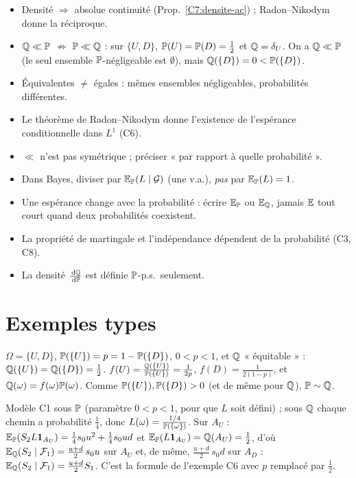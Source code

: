 \documentclass[11pt,a4paper]{article}
\begin{document}
\begin{liens}
\begin{itemize}
  \item Densité $\Rightarrow$ absolue continuité (Prop.~\ref{C7:densite-ac}) ; Radon--Nikodym donne la réciproque.
  \item $\mathbb{Q}\ll\mathbb{P}$ $\not\Rightarrow$ $\mathbb{P}\ll\mathbb{Q}$ : sur $\{U,D\}$, $\mathbb{P}(U)=\mathbb{P}(D)=\frac12$ et $\mathbb{Q}=\delta_U$. On a $\mathbb{Q}\ll\mathbb{P}$
  (le seul ensemble $\mathbb{P}$-négligeable est $\emptyset$), mais $\mathbb{Q}(\{D\})=0<\mathbb{P}(\{D\})$.
  \item Équivalentes $\neq$ égales : mêmes ensembles négligeables, probabilités différentes.
  \item Le théorème de Radon--Nikodym donne l'existence de l'espérance conditionnelle dans $L^1$ (C6).
\end{itemize}
\end{liens}

\begin{piege}
\begin{itemize}
  \item $\ll$ n'est pas symétrique ; préciser « par rapport à quelle probabilité ».
  \item Dans Bayes, diviser par $\mathbb{E}_{\mathbb{P}}(L\mid\mathcal{G})$ (une v.a.), \emph{pas} par $\mathbb{E}_{\mathbb{P}}(L)=1$.
  \item Une espérance change avec la probabilité : écrire $\mathbb{E}_{\mathbb{P}}$ ou $\mathbb{E}_{\mathbb{Q}}$, jamais $\mathbb{E}$ tout court quand deux probabilités coexistent.
  \item La propriété de martingale et l'indépendance dépendent de la probabilité (C3, C8).
  \item La densité $\frac{\,\mathrm{d}\mathbb{Q}}{\,\mathrm{d}\mathbb{P}}$ est définie $\mathbb{P}$-p.s.\ seulement.
\end{itemize}
\end{piege}

\section*{Exemples types}

\begin{exemple}\label{C7:ex-UD}
$\Omega=\{U,D\}$, $\mathbb{P}(\{U\})=p=1-\mathbb{P}(\{D\})$, $0<p<1$, et $\mathbb{Q}$ « équitable » : $\mathbb{Q}(\{U\})=\mathbb{Q}(\{D\})=\frac12$.
$f(U)=\frac{\mathbb{Q}(\{U\})}{\mathbb{P}(\{U\})}=\frac1{2p}$, $f(D)=\frac1{2(1-p)}$, et $\mathbb{Q}(\omega)=f(\omega)\mathbb{P}(\omega)$.
Comme $\mathbb{P}(\{U\}),\mathbb{P}(\{D\})>0$ (et de même pour $\mathbb{Q}$), $\mathbb{P}\sim\mathbb{Q}$.
\end{exemple}

\begin{exemple}\label{C7:ex-arbre}
Modèle C1 sous $\mathbb{P}$ (paramètre $0<p<1$, pour que $L$ soit défini) ; sous $\mathbb{Q}$ chaque chemin a probabilité $\frac14$, donc $L(\omega)=\frac{1/4}{\mathbb{P}(\{\omega\})}$.
Sur $A_U$ : $\mathbb{E}_{\mathbb{P}}(S_2L\mathbf{1}_{A_U})=\frac14s_0u^2+\frac14s_0ud$ et $\mathbb{E}_{\mathbb{P}}(L\mathbf{1}_{A_U})=\mathbb{Q}(A_U)=\frac12$, d'où
$\mathbb{E}_{\mathbb{Q}}(S_2\mid\mathcal{F}_1)=\frac{u+d}{2}\,s_0u$ sur $A_U$ et, de même, $\frac{u+d}2\,s_0d$ sur $A_D$ : $\mathbb{E}_{\mathbb{Q}}(S_2\mid\mathcal{F}_1)=\frac{u+d}2S_1$.
C'est la formule de l'exemple C6 avec $p$ remplacé par $\frac12$.
\end{exemple}
\end{document}
